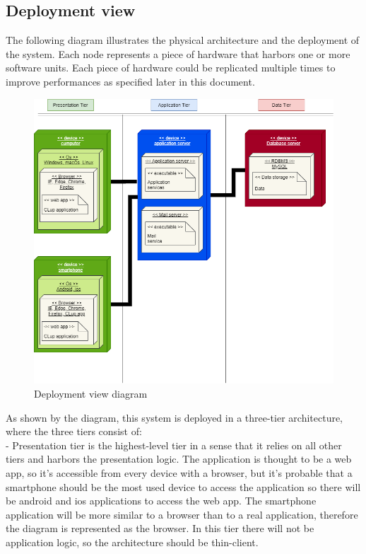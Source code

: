 \subsection{Deployment view}
The following diagram illustrates the physical architecture and the
deployment of the system.
Each node represents a piece of hardware that harbors one or more software units.
Each piece of hardware could be replicated multiple times to improve performances as specified later in this document.

\begin{figure}[H]
    \centering
    \hspace*{-3.5cm}
    \includegraphics[height=0.7\textwidth]{Images/TierDiagram.png}
    \caption{Deployment view diagram}
\end{figure}

As shown by the diagram, this system is deployed in a three-tier
architecture, where the three tiers consist of: \\

- Presentation tier is the highest-level tier in a sense that it relies on all other tiers and harbors the presentation logic.
The application is thought to be a web app, so it's accessible from every device with a browser, but it's probable that
a smartphone should be the most used device to access the application so there will be android and ios applications to access
the web app.
The smartphone application will be more similar to a browser than to a real application, therefore the diagram is represented as the browser.
In this tier there will not be application logic, so the architecture should be thin-client.\\

